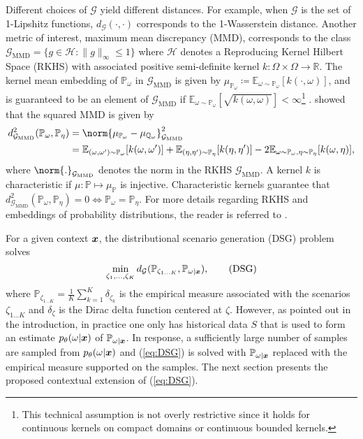 Different choices of $\mathcal{G}$ yield different distances. For example, when $\mathcal{G}$ is the set of 1-Lipshitz functions, $d_{\mathcal{G}}(\cdot, \cdot)$ corresponds to the 1-Wasserstein distance. Another metric of interest, maximum mean discrepancy (MMD), corresponds to the class $\mathcal{G}_{\text{MMD}} = \{g \in \mathcal{H}: \| g\|_{\infty} \leq 1 \} $ where $\mathcal{H}$ denotes a Reproducing Kernel Hilbert Space (RKHS) with associated positive semi-definite kernel $k: \Omega \times \Omega \rightarrow \mathbb{R}$. The kernel mean embedding of $\mathbb{P}_{\omega}$ in $\mathcal{G}_{\text{MMD}}$ is given by 
$\mu_{\mathbb{P}_{\omega}} \coloneq \mathbb{E}_{\omega \sim \mathbb{P}_{\omega}}[k(\cdot,\omega)]$, and is guaranteed to be an element of $\mathcal{G}_{\text{MMD}}$ if $\mathbb{E}_{\omega \sim \mathbb{P}_{\omega}}[\sqrt{k(\omega, \omega)}] < \infty$\footnote{This technical assumption is not overly restrictive since it holds for continuous kernels on
compact domains or continuous bounded kernels.} \citep{JMLR:v13:gretton12a}. \citet{JMLR:v13:gretton12a} showed that the squared MMD is given by
\begin{align*}
   d^2_{\mathcal{G}_{\text{MMD}}}(\mathbb{P}_{\omega}, \mathbb{P}_{\eta})& = \norm{\mu_{\mathbb{P}_{\omega}} - \mu_{\mathbb{Q}_{\omega}}}^2_{\mathcal{G}_{\text{MMD}}} \\ & =  \mathbb{E}_{(\omega, \omega') \sim \mathbb{P}_{\omega}}[k(\omega, \omega')] + \mathbb{E}_{(\eta, \eta') \sim \mathbb{P}_{\eta}}[k(\eta, \eta')] - 2\mathbb{E}_{\omega \sim \mathbb{P}_{\omega}, \eta \sim \mathbb{P}_{\eta}}[k(\omega, \eta)],
\end{align*}
where $\norm{.}_{\mathcal{G}_{\text{MMD}}}$ denotes the norm in the RKHS $\mathcal{G}_{\text{MMD}}$. A kernel $k$ is characteristic if $\mu : \mathbb{P} \mapsto \mu_{\mathbb{P}}$ is injective. Characteristic kernels guarantee that $d^2_{\mathcal{G}_{\text{MMD}}}(\mathbb{P}_{\omega}, \mathbb{P}_{\eta}) = 0 \iff \mathbb{P}_{\omega} = \mathbb{P}_{\eta}$. For more details regarding RKHS and embeddings of probability distributions, the reader is referred to \citep{JMLR:v13:gretton12a, muandet2017kernel}. 


For a given context $\boldsymbol{x}$, the distributional scenario generation (DSG) problem solves
\begin{equation}\label{eq:DSG}
\min_{\zeta_1,\hdots, \zeta_K} d_{\mathcal{G}}(\mathbb{P}_{\zeta_{1 \hdots K}}, \mathbb{P}_{\omega | \boldsymbol{x}}), \tag{DSG}
\end{equation}
where $\mathbb{P}_{\zeta_{1 \hdots K}} = \frac{1}{K} \sum_{k=1}^K \delta_{\zeta_k}$ is the empirical measure associated with the scenarios $\zeta_{1 \hdots K}$ and $\delta_{\zeta}$ is the Dirac delta function centered at $\zeta$. However, as pointed out in the introduction, in practice one only has historical data $S$ that is used to form an estimate $p_{\theta}(\omega | \boldsymbol{x})$ of $\mathbb{P}_{\omega | \boldsymbol{x}}$. In response, a sufficiently large number of samples are sampled from $p_{\theta}(\omega | \boldsymbol{x})$ and (\ref{eq:DSG}) is solved with $\mathbb{P}_{\omega | \boldsymbol{x}}$ replaced with the empirical measure supported on the samples. The next section presents the proposed contextual extension of (\ref{eq:DSG}).



